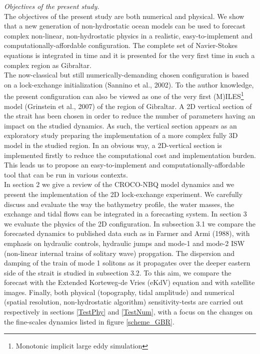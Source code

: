 \documentclass[a4paper,12pt]{article}
\begin{document}
\textit{Objectives of the present study.}\\
The objectives of the present study are both numerical and physical. We show that a new generation of non-hydrostatic ocean models can be used to forecast complex non-linear, non-hydrostatic physics in a realistic, easy-to-implement and computationally-affordable configuration. The complete set of Navier-Stokes equations is integrated in time and it is presented for the very first time in such a complex region as Gibraltar.\\
The now-classical but still numerically-demanding chosen configuration is based on a lock-exchange initialization (Sannino et al., 2002). To the author knowledge, the present configuration can also be viewed as one of the very first (M)ILES\footnote{Monotonic implicit large eddy simulation \color{black}} model (Grinstein et al., 2007) of the region of Gibraltar. 
A 2D vertical section of the strait has been chosen in order to reduce the number of parameters having an impact on the studied dynamics. As such, the vertical section appears as an exploratory study preparing the implementation of a more complex fully 3D model in the studied region. In an obvious way, a 2D-vertical section is implemented firstly to reduce the computational cost and implementation burden. This leads us to propose an easy-to-implement and computationally-affordable tool that can be run in various contexts.\\


In section 2 we give a review of the CROCO-NBQ model dynamics and we present the implementation of the 2D lock-exchange experiment. We carefully discuss and evaluate the way the bathymetry profile, the water masses, the exchange and tidal flows can be integrated in a forecasting system. In section 3 we evaluate the physics of the 2D configuration. In subsection 3.1 we compare the forecasted dynamics to published data such as in Farmer and Armi (1988), with emphasis on hydraulic controls, hydraulic jumps and mode-1 and mode-2 ISW (non-linear internal trains of solitary wave) propgation. The dispersion and damping of the train of mode 1 solitons as it propagates over the deeper eastern side of the strait is studied in subsection 3.2. To this aim, we compare the forecast with the Extended Korteweg-de Vries (eKdV) equation and with satellite images. Finally, both physical (topography, tidal amplitude) and numerical (spatial resolution, non-hydrostatic algorithm) sensitivity-tests are carried out respectively in sections \ref{TestPhy} and \ref{TestNum}, with a focus on the changes on the fine-scales dynamics listed in figure \ref{scheme_GBR}.
\end{document}
